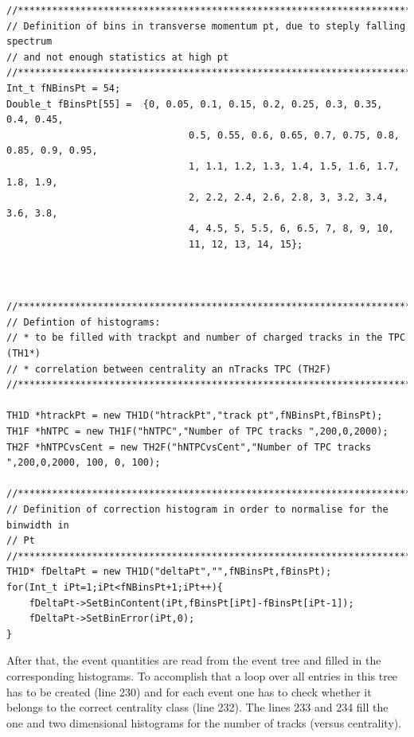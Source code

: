 \documentclass{article}
\begin{document}
\begin{lstlisting}[firstnumber=185]
//*********************************************************************************
// Definition of bins in transverse momentum pt, due to steply falling spectrum 
// and not enough statistics at high pt 
//*********************************************************************************
Int_t fNBinsPt = 54; 								 
Double_t fBinsPt[55] = 	{0, 0.05, 0.1, 0.15, 0.2, 0.25, 0.3, 0.35, 0.4, 0.45,
								0.5, 0.55, 0.6, 0.65, 0.7, 0.75, 0.8, 0.85, 0.9, 0.95,
								1, 1.1, 1.2, 1.3, 1.4, 1.5, 1.6, 1.7, 1.8, 1.9,
								2, 2.2, 2.4, 2.6, 2.8, 3, 3.2, 3.4, 3.6, 3.8,
								4, 4.5, 5, 5.5, 6, 6.5, 7, 8, 9, 10, 
								11, 12, 13, 14, 15};
								
								
								
//*********************************************************************************
// Defintion of histograms:
// * to be filled with trackpt and number of charged tracks in the TPC (TH1*)
// * correlation between centrality an nTracks TPC (TH2F)							 
//*********************************************************************************	
								
TH1D *htrackPt = new TH1D("htrackPt","track pt",fNBinsPt,fBinsPt);
TH1F *hNTPC = new TH1F("hNTPC","Number of TPC tracks ",200,0,2000);
TH2F *hNTPCvsCent = new TH2F("hNTPCvsCent","Number of TPC tracks ",200,0,2000, 100, 0, 100);

//*********************************************************************************
// Definition of correction histogram in order to normalise for the binwidth in
// Pt
//*********************************************************************************
TH1D* fDeltaPt = new TH1D("deltaPt","",fNBinsPt,fBinsPt);
for(Int_t iPt=1;iPt<fNBinsPt+1;iPt++){
	fDeltaPt->SetBinContent(iPt,fBinsPt[iPt]-fBinsPt[iPt-1]);
	fDeltaPt->SetBinError(iPt,0);
}
\end{lstlisting}

After that, the event quantities are read from the event tree and filled in 
the corresponding histograms. To accomplish that a loop over all entries in 
this tree has to be created (line 230) and for each event one has to check 
whether it belongs to the correct centrality class (line 232). The lines 233 
and 234 fill the one and two dimensional histograms for the number of tracks 
(versus centrality).
\end{document}
